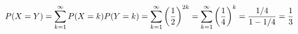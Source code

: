 \documentclass[preview]{standalone}
\begin{document}
\begin{align*}
\special{dvisvgm:raw <g id='unique000'>}P(X=Y)=\displaystyle\sum_{k=1}^{\infty}P(X=k)P(Y=k)=\sum_{k=1}^{\infty}\left(\dfrac{1}{2}\right)^{2k}=\sum_{k=1}^{\infty}\left(\dfrac{1}{4}\right)^k=\dfrac{1/4}{1-1/4}=\dfrac{1}{3}\special{dvisvgm:raw </g>}
\end{align*}
\end{document}
